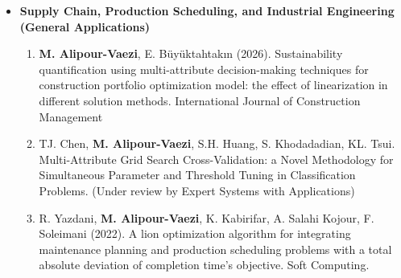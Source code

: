 \documentclass[9pt,a4paper]{extarticle}
\newcommand{\CategoryFont}
    {\fontsize{9.5}{10.35}\selectfont}
\newcommand{\BodyFont}
    {\fontsize{8.5}{9.30}\selectfont}
\newcommand{\cvcategory}[1]{%
    {\CategoryFont\bfseries\color{CVBody}#1}%
}
\newenvironment{cvcatlist}{%
    \begin{itemize}[
        leftmargin=0pt,
        labelsep=0pt,
        label={},
        topsep=0pt,
        itemsep=-0.5pt,
        parsep=0pt,
        partopsep=0pt
    ]
}{%
    \end{itemize}
}
\newenvironment{cvsublist}{%
    \begin{enumerate}[
        leftmargin=0.24in,
        labelsep=0.04in,
        label={\BodyFont\color{CVBody}\arabic*.},
        start=1,
        topsep=-0.8pt,
        itemsep=-0.8pt,
        parsep=0pt,
        partopsep=0pt
    ]
}{%
    \end{enumerate}
}
\newcommand{\pubitem}[1]{%
    \item\relax
    {\BodyFont\color{CVBody}\ignorespaces#1\unskip}%
}
\begin{document}
\begin{cvcatlist}
\begin{cvsublist}
\pubitem{
\textbf{M. Alipour-Vaezi},
K.L. Tsui
(2024).
Data-driven portfolio management for motion pictures industry:
A new data-driven optimization methodology
using a large language model as the expert,
Computers \& Industrial Engineering,
197, 110574
}

\pubitem{
\textbf{M. Alipour-Vaezi},
A. Aghsami,
M. Rabbani
(2022).
Introducing a novel revenue-sharing contract
in media supply chain management
using data mining and multi-criteria decision-making methods.
Soft Computing,
26(6), 2883-2900.
}

\pubitem{
\textbf{M. Alipour-Vaezi},
R. Tavakkoli-Moghaddam,
Z. Mohammadnazari
(2022).
Optimization of a television advertisement scheduling problem
by multi-criteria decision-making and dispatching rules.
Multimedia Tools and Applications,
81(8), 11755-11772.
}

\pubitem{
S. Dashtakian-Nasrabad,
M. Esmaeili-Qeshlaqi,
\textbf{M. Alipour-Vaezi},
A. Aghsami,
F. Jolai
(2024).
A bi-objective optimization mathematical Model integrated
with a bulk-arrival Markovian Queueing System and Machine Learning
in publishing industries.
International Journal of Management Science
and Engineering Management.
}

\end{cvsublist}



\item \cvcategory{
Supply Chain, Production Scheduling,
and Industrial Engineering (General Applications)
}

\begin{cvsublist}

\pubitem{
\textbf{M. Alipour-Vaezi},
E. Büyüktahtakın (2026).
Sustainability quantification using multi-attribute decision-making techniques for construction portfolio optimization model: the effect of linearization in different solution methods. International Journal of Construction Management
}

\pubitem{
TJ. Chen, \textbf{M. Alipour-Vaezi}, S.H. Huang, S. Khodadadian,
KL. Tsui.
Multi-Attribute Grid Search Cross-Validation:
a Novel Methodology for Simultaneous Parameter
and Threshold Tuning in Classification Problems. (Under review by Expert Systems with Applications)
}

\pubitem{
R. Yazdani,
\textbf{M. Alipour-Vaezi},
K. Kabirifar,
A. Salahi Kojour,
F. Soleimani
(2022).
A lion optimization algorithm for integrating maintenance planning
and production scheduling problems
with a total absolute deviation of completion time’s objective.
Soft Computing.
}


\end{cvsublist}
\end{cvcatlist}
\end{document}

